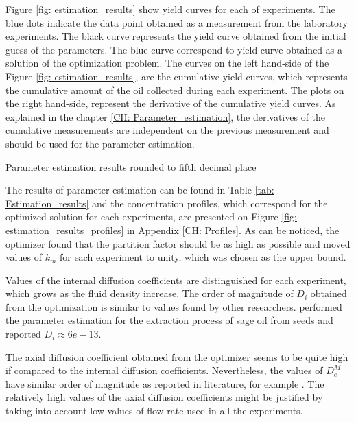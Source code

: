 \documentclass[../Article_Model_Parameters.tex]{subfiles}
\begin{document}
	Figure \ref{fig: estimation_results} show yield curves for each of experiments. The blue dots indicate the data point obtained as a measurement from the laboratory experiments. The black curve represents the yield curve obtained from the initial guess of the parameters. The blue curve correspond to yield curve obtained as a solution of the optimization problem. The curves on the left hand-side of the Figure \ref{fig: estimation_results}, are the cumulative yield curves, which represents the cumulative amount of the oil collected during each experiment. The plots on the right hand-side, represent the derivative of the cumulative yield curves. As explained in the chapter \ref{CH: Parameter_estimation}, the derivatives of the cumulative measurements are independent on the previous measurement and should be used for the parameter estimation.

	\begin{table}[!h]
		\centering
		\caption{Parameter estimation results rounded to fifth decimal place}
		\label{tab: Estimation_results}
	\end{table}

	The results of parameter estimation can be found in Table \ref{tab: Estimation_results} and the concentration profiles, which correspond for the optimized solution for each experiments, are presented on Figure \ref{fig: estimation_results_profiles} in Appendix \ref{CH: Profiles}. As can be noticed, the optimizer found that the partition factor should be as high as possible and moved values of $k_m$ for each experiment to unity, which was chosen as the upper bound.
		
	Values of the internal diffusion coefficients are distinguished for each experiment, which grows as the fluid density increase. The order of magnitude of $D_i$ obtained from the optimization is similar to values found by other researchers. \citet{Reverchon1996} performed the parameter estimation for the extraction process of sage oil from seeds and reported $D_i \approx 6e-13$.
	
	The axial diffusion coefficient obtained from the optimizer seems to be quite high if compared to the internal diffusion coefficients. Nevertheless, the values of $D_e^M$ have similar order of magnitude as reported in literature, for example \citet{ReisVasco2000}. The relatively high values of the axial diffusion coefficients might be justified by taking into account low values of flow rate used in all the experiments.
	
\end{document}
